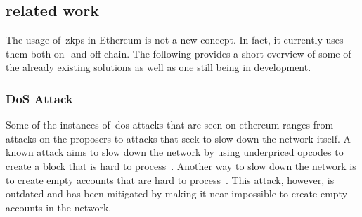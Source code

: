 \subsection{related work}\label{subsec:related-work}
The usage of~\glspl{zkp} in Ethereum is not a new concept.
In fact, it currently uses them both on- and off-chain.
The following provides a short overview of some of the already existing solutions as well as one still being in development.


\subsubsection{DoS Attack}\label{subsubsec:dos-attack}
Some of the instances of~\gls{dos} attacks that are seen on ethereum ranges from attacks on the proposers to attacks that seek to slow down the network itself.
A known attack aims to slow down the network by using underpriced opcodes to create a block that is hard to process~\cite{10.1145/3391195,9815256}.
Another way to slow down the network is to create empty accounts that are hard to process~\cite{empty-account-mitigation,empty-account-eip-mitigation}.
This attack, however, is outdated and has been mitigated by making it near impossible to create empty accounts in the network.

